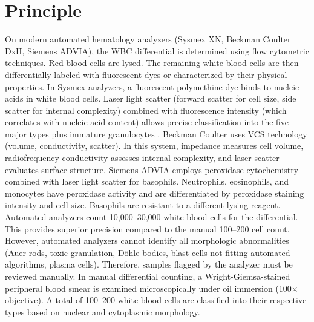 \section*{Principle}
On modern automated hematology analyzers (Sysmex XN, Beckman Coulter DxH, Siemens ADVIA), the WBC differential is determined using flow cytometric techniques. Red blood cells are lysed. The remaining white blood cells are then differentially labeled with fluorescent dyes or characterized by their physical properties. In Sysmex analyzers, a fluorescent polymethine dye binds to nucleic acids in white blood cells. Laser light scatter (forward scatter for cell size, side scatter for internal complexity) combined with fluorescence intensity (which correlates with nucleic acid content) allows precise classification into the five major types plus immature granulocytes \cite{briggs2012performance}. Beckman Coulter uses VCS technology (volume, conductivity, scatter). In this system, impedance measures cell volume, radiofrequency conductivity assesses internal complexity, and laser scatter evaluates surface structure. Siemens ADVIA employs peroxidase cytochemistry combined with laser light scatter for basophils. Neutrophils, eosinophils, and monocytes have peroxidase activity and are differentiated by peroxidase staining intensity and cell size. Basophils are resistant to a different lysing reagent. Automated analyzers count 10,000--30,000 white blood cells for the differential. This provides superior precision compared to the manual 100--200 cell count. However, automated analyzers cannot identify all morphologic abnormalities (Auer rods, toxic granulation, D\"{o}hle bodies, blast cells not fitting automated algorithms, plasma cells). Therefore, samples flagged by the analyzer must be reviewed manually. In manual differential counting, a Wright-Giemsa-stained peripheral blood smear is examined microscopically under oil immersion (100$\times$ objective). A total of 100--200 white blood cells are classified into their respective types based on nuclear and cytoplasmic morphology.

